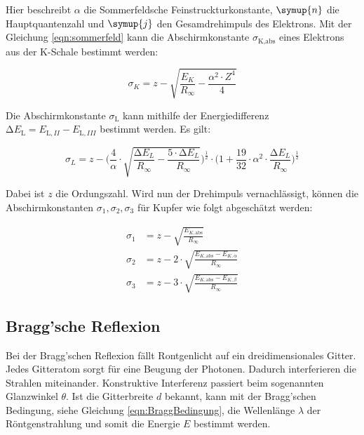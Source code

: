 \noindent
Hier beschreibt $\alpha$ die Sommerfeldsche Feinstruckturkonstante, $\symup{n}$ die Hauptquantenzahl und $\symup{j}$ den Gesamdrehimpuls des Elektrons.
Mit der Gleichung \eqref{eqn:sommerfeld} kann die Abschirmkonstante $\sigma_\text{K,abs}$ eines Elektrons aus der K-Schale bestimmt werden:

\begin{equation}\label{eqn:absorptionskoeff}
    \sigma_K = z - \sqrt{\frac{E_K}{R_{\infty}} - \frac{\alpha^2 \cdot Z^4}{4}}
\end{equation}

\noindent
Die Abschirmkonstante $\sigma_{\text{L}}$ kann mithilfe der Energiedifferenz $\increment E_{\text{L}} = E_{\text{L},II} -E_{\text{L},III}$ bestimmt werden.
Es gilt:

\begin{equation}
    \sigma_L = z -\Biggl( \frac{4}{\alpha} \cdot \sqrt{\frac{\increment E_L}{R_{\infty}} - \frac{5 \cdot \increment E_L}{R_{\infty}}} \Biggr)^{\frac{1}{2}}
                \cdot \Biggl(1 + \frac{19}{32} \cdot \alpha^2 \cdot \frac{\increment E_L}{R_{\infty}} \Biggr)^{\frac{1}{2}}
\end{equation}

\noindent
Dabei ist $z$ die Ordungszahl.
Wird nun der Drehimpuls vernachlässigt, können die Abschirmkonstanten $\sigma_1, \sigma_2, \sigma_3$ für Kupfer wie folgt abgeschätzt werden:

\begin{align}
    \sigma_1 &= z - \sqrt{\frac{E_{K,\text{abs}}}{R_{\infty}}} \label{eq:sigma1} \\
    \sigma_2 &= z - 2 \cdot \sqrt{\frac{E_{K,\text{abs}} - E_{K, \alpha}}{R_{\infty}}} \label{eq:sigma2} \\
    \sigma_3 &= z - 3 \cdot \sqrt{\frac{E_{K,\text{abs}} - E_{K, \beta}}{R_{\infty}}} \label{eq:sigma3} 
\end{align}

\subsection{Bragg'sche Reflexion}
\label{subsec:Bragg}

Bei der Bragg'schen Reflexion fällt Rontgenlicht auf ein dreidimensionales Gitter.
Jedes Gitteratom sorgt für eine Beugung der Photonen.
Dadurch interferieren die Strahlen miteinander.
Konstruktive Interferenz passiert beim sogenannten Glanzwinkel $\theta$.
Ist die Gitterbreite $d$ bekannt, kann mit der Bragg'schen Bedingung, siehe Gleichung \eqref{eqn:BraggBedingung},
die Wellenlänge $\lambda$ der Röntgenstrahlung und somit die Energie $E$ bestimmt werden.

